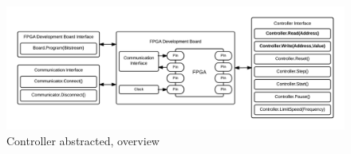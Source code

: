 \documentclass[openright]{template/uva-bachelor-thesis}
\begin{document}



\begin{figure}[h]
\centering
\includegraphics[width=\textwidth]{img/overview-abstract}
\caption{Controller abstracted, overview}
\label{fig:overview-abstract}
\end{figure}
















\end{document}
